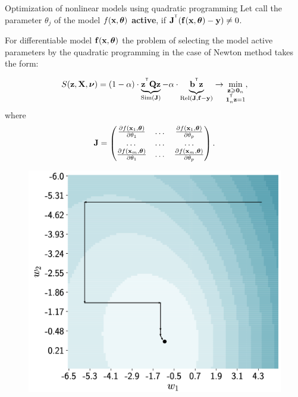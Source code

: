 \documentclass[10pt]{beamer}
\begin{document}
\begin{frame}{Optimization of nonlinear models using quadratic programming}
	Let call the parameter $\theta_j$ of the model $f(\mathbf{x}, \boldsymbol{\theta})$ \textbf{active}, if $\mathbf{J}^{^{\text{\tiny\sffamily\upshape\mdseries T}}} (\mathbf{f}(\mathbf{x}, \boldsymbol{\theta}) - \mathbf{y}) \neq 0$.
	\begin{theorem}[Isachenko, 2018]
		For differentiable model $\mathbf{f}(\mathbf{x}, \boldsymbol{\theta})$ the problem of selecting the model active parameters by the quadratic programming in the case of Newton method takes the form:
		
		\begin{minipage}{0.55\linewidth}
				\[
				S(\mathbf{z}, \mathbf{X}, \boldsymbol{\nu}) = (1 - \alpha) \cdot \underbrace{\mathbf{z}^{^{\text{\tiny\sffamily\upshape\mdseries T}}} \mathbf{Q} \mathbf{z}}_{\textnormal{Sim}(\mathbf{J})} - \alpha \cdot \underbrace{\vphantom{()} \mathbf{b}^{^{\text{\tiny\sffamily\upshape\mdseries T}}} \mathbf{z}}_{\textnormal{Rel}(\mathbf{J},  \mathbf{f} - \mathbf{y})} \rightarrow \min_{\substack{\mathbf{z} \geqslant \boldsymbol{0}_n \\ \boldsymbol{1}_n^{^{\text{\tiny\sffamily\upshape\mdseries T}}} \mathbf{z}=1}},
				\]
			where
			\begin{equation*}
				 \mathbf{J} = 
				\begin{pmatrix}
					\frac{\partial f(\mathbf{x}_1 , \boldsymbol{\theta})}{\partial \theta_1} & \dots & 
					\frac{\partial f(\mathbf{x}_1 , \boldsymbol{\theta})}{\partial \theta_p} \\
					\dots & \dots & \dots \\
					\frac{\partial f(\mathbf{x}_m , \boldsymbol{\theta})}{\partial \theta_1} & \dots & 
					\frac{\partial f(\mathbf{x}_m , \boldsymbol{\theta})}{\partial \theta_p}
				\end{pmatrix}.
			\end{equation*}
		\end{minipage}%
		\begin{minipage}{0.45\linewidth}
			\begin{figure}
				\includegraphics[width=0.9\linewidth]{figs/newton_qpfs}
			\end{figure}
		\end{minipage}
	\end{theorem}
\end{frame}
\end{document}

